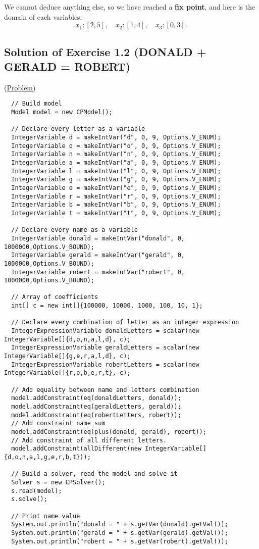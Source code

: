 We cannot deduce anything else, so we have reached a \textbf{fix point}, and here is the domain of each variables:
$$x_{1} : [2,5],\quad x_{2} : [1,4],\quad x_{3} : [0,3].$$


\subsection{Solution of Exercise 1.2 (DONALD + GERALD = ROBERT)}\label{solutions:solutionofexercise1.2}\hypertarget{solutions:solutionofexercise1.2}{}

(\hyperlink{exercises:exercise1.2}{Problem})

\begin{lstlisting}
  // Build model
  Model model = new CPModel();
  
  // Declare every letter as a variable
  IntegerVariable d = makeIntVar("d", 0, 9, Options.V_ENUM);
  IntegerVariable o = makeIntVar("o", 0, 9, Options.V_ENUM);
  IntegerVariable n = makeIntVar("n", 0, 9, Options.V_ENUM);
  IntegerVariable a = makeIntVar("a", 0, 9, Options.V_ENUM);
  IntegerVariable l = makeIntVar("l", 0, 9, Options.V_ENUM);
  IntegerVariable g = makeIntVar("g", 0, 9, Options.V_ENUM);
  IntegerVariable e = makeIntVar("e", 0, 9, Options.V_ENUM);
  IntegerVariable r = makeIntVar("r", 0, 9, Options.V_ENUM);
  IntegerVariable b = makeIntVar("b", 0, 9, Options.V_ENUM);
  IntegerVariable t = makeIntVar("t", 0, 9, Options.V_ENUM);
  
  // Declare every name as a variable  
  IntegerVariable donald = makeIntVar("donald", 0, 1000000,Options.V_BOUND);
  IntegerVariable gerald = makeIntVar("gerald", 0, 1000000,Options.V_BOUND);
  IntegerVariable robert = makeIntVar("robert", 0, 1000000,Options.V_BOUND);
  
  // Array of coefficients
  int[] c = new int[]{100000, 10000, 1000, 100, 10, 1}; 
  
  // Declare every combination of letter as an integer expression
  IntegerExpressionVariable donaldLetters = scalar(new IntegerVariable[]{d,o,n,a,l,d}, c);
  IntegerExpressionVariable geraldLetters = scalar(new IntegerVariable[]{g,e,r,a,l,d}, c);
  IntegerExpressionVariable robertLetters = scalar(new IntegerVariable[]{r,o,b,e,r,t}, c);
  
  // Add equality between name and letters combination
  model.addConstraint(eq(donaldLetters, donald));
  model.addConstraint(eq(geraldLetters, gerald));
  model.addConstraint(eq(robertLetters, robert));
  // Add constraint name sum
  model.addConstraint(eq(plus(donald, gerald), robert));
  // Add constraint of all different letters.
  model.addConstraint(allDifferent(new IntegerVariable[]{d,o,n,a,l,g,e,r,b,t}));
  
  // Build a solver, read the model and solve it
  Solver s = new CPSolver();
  s.read(model);
  s.solve();
  
  // Print name value
  System.out.println("donald = " + s.getVar(donald).getVal());
  System.out.println("gerald = " + s.getVar(gerald).getVal());
  System.out.println("robert = " + s.getVar(robert).getVal());
\end{lstlisting}

